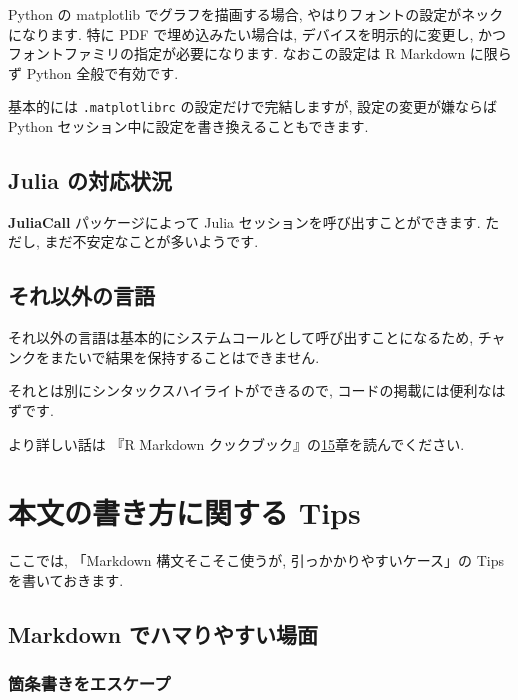 \documentclass[
]{ltjsarticle}
\begin{document}
Python の matplotlib でグラフを描画する場合, やはりフォントの設定がネックになります. 特に PDF で埋め込みたい場合は, デバイスを明示的に変更し, かつフォントファミリの指定が必要になります. なおこの設定は R Markdown に限らず Python 全般で有効です.

基本的には \texttt{.matplotlibrc} の設定だけで完結しますが, 設定の変更が嫌ならば Python セッション中に設定を書き換えることもできます.

\hypertarget{julia-ux306eux5bfeux5fdcux72b6ux6cc1}{%
\subsection{Julia の対応状況}\label{julia-ux306eux5bfeux5fdcux72b6ux6cc1}}

\textbf{JuliaCall} パッケージによって Julia セッションを呼び出すことができます. ただし, まだ不安定なことが多いようです.

\hypertarget{ux305dux308cux4ee5ux5916ux306eux8a00ux8a9e}{%
\subsection{それ以外の言語}\label{ux305dux308cux4ee5ux5916ux306eux8a00ux8a9e}}

それ以外の言語は基本的にシステムコールとして呼び出すことになるため, チャンクをまたいで結果を保持することはできません.

それとは別にシンタックスハイライトができるので, コードの掲載には便利なはずです.

より詳しい話は 『R Markdown クックブック』の\href{https://gedevan-aleksizde.github.io/rmarkdown-cookbook/other-languages.html}{15}章を読んでください.

\hypertarget{advanced-syntax}{%
\section{本文の書き方に関する Tips}\label{advanced-syntax}}

ここでは, 「Markdown 構文そこそこ使うが, 引っかかりやすいケース」の Tips を書いておきます.

\hypertarget{markdown-ux3067ux30cfux30deux308aux3084ux3059ux3044ux5834ux9762}{%
\subsection{Markdown でハマりやすい場面}\label{markdown-ux3067ux30cfux30deux308aux3084ux3059ux3044ux5834ux9762}}

\hypertarget{ux7b87ux6761ux66f8ux304dux3092ux30a8ux30b9ux30b1ux30fcux30d7}{%
\subsubsection{箇条書きをエスケープ}\label{ux7b87ux6761ux66f8ux304dux3092ux30a8ux30b9ux30b1ux30fcux30d7}}
\end{document}
